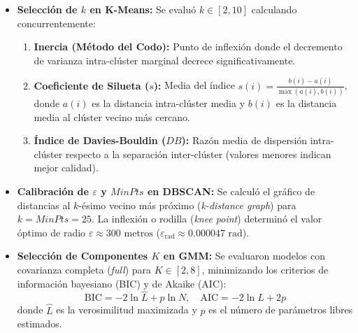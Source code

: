 \begin{itemize}
    \item \textbf{Selección de $k$ en K-Means:} Se evaluó $k \in [2, 10]$ calculando concurrentemente:
    \begin{enumerate}
        \item \textbf{Inercia (Método del Codo):} Punto de inflexión donde el decremento de varianza intra-clúster marginal decrece significativamente.
        \item \textbf{Coeficiente de Silueta ($s$):} Media del índice $s(i) = \frac{b(i) - a(i)}{\max(a(i), b(i))}$, donde $a(i)$ es la distancia intra-clúster media y $b(i)$ es la distancia media al clúster vecino más cercano.
        \item \textbf{Índice de Davies-Bouldin ($DB$):} Razón media de dispersión intra-clúster respecto a la separación inter-clúster (valores menores indican mejor calidad).
    \end{enumerate}
    \item \textbf{Calibración de $\varepsilon$ y $MinPts$ en DBSCAN:} Se calculó el gráfico de distancias al $k$-ésimo vecino más próximo (\textit{k-distance graph}) para $k = MinPts = 25$. La inflexión o rodilla (\textit{knee point}) determinó el valor óptimo de radio $\varepsilon \approx 300\text{ metros}$ ($\varepsilon_{\text{rad}} \approx 0.000047\text{ rad}$).
    \item \textbf{Selección de Componentes $K$ en GMM:} Se evaluaron modelos con covarianza completa (\textit{full}) para $K \in [2, 8]$, minimizando los criterios de información bayesiano (BIC) y de Akaike (AIC):
    \begin{equation}
        \text{BIC} = -2 \ln \hat{L} + p \ln N, \quad \text{AIC} = -2 \ln \hat{L} + 2p
    \end{equation}
    donde $\hat{L}$ es la verosimilitud maximizada y $p$ es el número de parámetros libres estimados.
\end{itemize}

